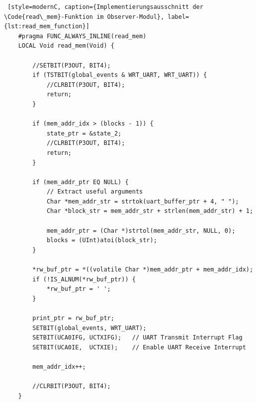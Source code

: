\newpage
\begin{lstlisting} [style=modernC, caption={Implementierungsausschnitt der \Code{read\_mem}-Funktion im Observer-Modul}, label={lst:read_mem_function}]
	#pragma FUNC_ALWAYS_INLINE(read_mem)
	LOCAL Void read_mem(Void) {
		
		//SETBIT(P3OUT, BIT4);
		if (TSTBIT(global_events & WRT_UART, WRT_UART)) {
			//CLRBIT(P3OUT, BIT4);
			return;
		}
		
		if (mem_addr_idx > (blocks - 1)) {
			state_ptr = &state_2;
			//CLRBIT(P3OUT, BIT4);
			return;
		}
		
		if (mem_addr_ptr EQ NULL) {
			// Extract useful arguments
			Char *mem_addr_str = strtok(uart_buffer_ptr + 4, " ");
			Char *block_str = mem_addr_str + strlen(mem_addr_str) + 1;
			
			mem_addr_ptr = (Char *)strtol(mem_addr_str, NULL, 0);
			blocks = (UInt)atoi(block_str);
		}
		
		*rw_buf_ptr = *((volatile Char *)mem_addr_ptr + mem_addr_idx);
		if (!IS_ALNUM(*rw_buf_ptr)) {
			*rw_buf_ptr = ' ';
		}
		
		print_ptr = rw_buf_ptr;
		SETBIT(global_events, WRT_UART);
		SETBIT(UCA0IFG, UCTXIFG);   // UART Transmit Interrupt Flag
		SETBIT(UCA0IE,  UCTXIE);    // Enable UART Receive Interrupt
		
		mem_addr_idx++;
		
		//CLRBIT(P3OUT, BIT4);
	}
\end{lstlisting}

